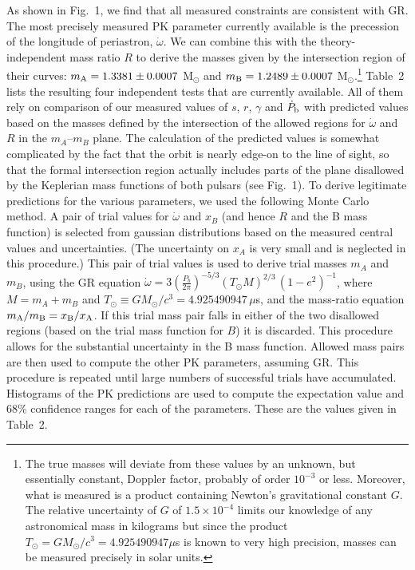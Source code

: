 \documentclass[12pt,psfig]{article}
\begin{document}
As shown in Fig.~1,
we find that all measured constraints are consistent with GR. The
most precisely measured PK parameter currently available is the precession of
the longitude of periastron, $\dot{\omega}$. We can combine this with the
theory-independent mass ratio $R$ to derive the masses given by the
intersection region of their curves: $m_{\rm{A}} = 1.3381\pm0.0007$ M$_\odot$
and $m_{\rm{B}} = 1.2489\pm0.0007$ M$_\odot$.\footnote{The true masses will
  deviate from these values by an unknown, but essentially constant, Doppler
  factor, probably of order $10^{-3}$ or less\cite{dd86}. Moreover,
  what is measured is a product containing Newton's gravitational constant
  $G$. The relative uncertainty of $G$ of $1.5 \times 10^{-4}$ limits our
  knowledge of any astronomical mass in kilograms but since the product 
  $T_\odot = GM_{\odot}/c^3 = 4.925490947\mu$s 
  is known to very high precision, masses can be measured precisely
  in solar units.}
Table~2 lists the
resulting four independent tests that are currently available.  All of them
rely on comparison of our measured values of $s$, $r$, $\gamma$ and $\dot
P_{\rm b}$ with predicted values based on the masses defined by the
intersection of the allowed regions for $\dot\omega$ and $R$ in the
$m_A$--$m_B$ plane. The calculation of the predicted values is somewhat
complicated by the fact that the orbit is nearly edge-on to the line of sight,
so that the formal intersection region actually includes parts of the plane
disallowed by the Keplerian mass functions of both pulsars (see Fig.~1).
To derive legitimate predictions for the various parameters, we
used the following Monte Carlo method.  A pair of trial values for
$\dot\omega$ and $x_B$ (and hence $R$ and the B mass function) is selected
from gaussian distributions based on the measured central values and
uncertainties. (The uncertainty on $x_A$ is very small and is neglected in
this procedure.)  This pair of trial values is used to derive trial masses
$m_A$ and $m_B$, using the GR equation $\dot \omega = 3
(\frac{P_b}{2\pi})^{-5/3} (T_\odot M)^{2/3}\,(1-e^2)^{-1}$, where $M =
m_A+m_B$ and $T_\odot\equiv GM_\odot/c^3 = 4.925490947\,\mu$s, and the
mass-ratio equation $m_{\rm{A}}/m_{\rm{B}} = x_{\rm{B}}/x_{\rm{A}}$. If this
trial mass pair falls in either of the two disallowed regions (based on the
trial mass function for $B$) it is discarded. This procedure allows for the
substantial uncertainty in the B mass function. Allowed mass pairs are 
then used to
compute the other PK parameters, assuming GR.  This procedure is repeated
until large numbers of successful trials have accumulated.  Histograms of the
PK predictions are used to compute the expectation value and 68\% confidence
ranges for each of the parameters.  These are the values given in Table~2.
\end{document}
